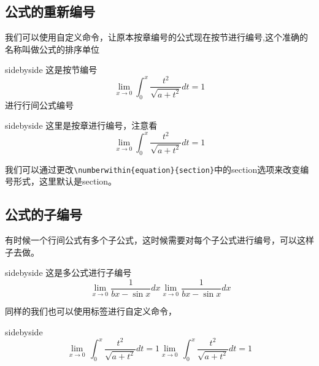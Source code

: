 \documentclass[cn,chinese,color=cyan]{elegantbook}
\begin{document}
\subsection{公式的重新编号}
我们可以使用自定义命令，让原本按章编号的公式现在按节进行编号,这个准确的名称叫做公式的排序单位
\begin{tcblisting}{sidebyside}
这是按节编号
\begin{equation}
\lim _{x \rightarrow 0}\int_{0}^{x} \frac{t^{2}}{\sqrt{a+t^{2}}} d t=1
\end{equation}
进行行间公式编号
\end{tcblisting}

\begin{tcblisting}{sidebyside}
这里是按章进行编号，注意看
\begin{equation}
\lim _{x \rightarrow 0}\int_{0}^{x} \frac{t^{2}}{\sqrt{a+t^{2}}} d t=1
\end{equation}
\end{tcblisting}
\begin{note}
我们可以通过更改\verb|\numberwithin{equation}{section}|中的section选项来改变编号形式，这里默认是section。
\end{note}
\subsection{公式的子编号}
有时候一个行间公式有多个子公式，这时候需要对每个子公式进行编号，可以这样子去做。
\begin{tcblisting}{sidebyside}
这是多公式进行子编号
\begin{subequations}
\begin{equation}\
\lim _{x \rightarrow 0} \frac{1}{b x-\sin x}dx
\end{equation}
\begin{equation}
\lim _{x \rightarrow 0} \frac{1}{b x-\sin x}dx
\end{equation}
\end{subequations}
\end{tcblisting}
同样的我们也可以使用标签进行自定义命令，
\begin{tcblisting}{sidebyside}
\begin{subequations}
\begin{equation}\tag{$\alpha$}
\underset{x\to 0}{\mathop{\lim }}\,\int_{0}^{x}
{\frac{{{t}^{2}}}{\sqrt{a+{{t}^{2}}}}dt=1}
\end{equation}
\begin{equation}\tag{$\beta$}
\underset{x\to 0}{\mathop{\lim }}\,\int_{0}^{x}
{\frac{{{t}^{2}}}{\sqrt{a+{{t}^{2}}}}dt=1}
\end{equation}
\end{subequations}
\end{tcblisting}
\end{document}
